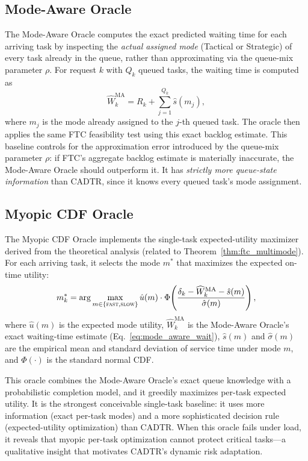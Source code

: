 \documentclass[fleqn,12pt,lineno]{wlpeerj}
\begin{document}
\subsection{Mode-Aware Oracle}
\label{sec:baseline_mode_aware}

The Mode-Aware Oracle computes the exact predicted waiting time for each arriving task by inspecting the \emph{actual assigned mode} (Tactical or Strategic) of every task already in the queue, rather than approximating via the queue-mix parameter $\rho$. For request $k$ with $Q_k$ queued tasks, the waiting time is computed as
\begin{equation}
\widehat{W}_k^{\mathrm{MA}} = R_k + \sum_{j=1}^{Q_k} \hat{s}(m_j),
\label{eq:mode_aware_wait}
\end{equation}
where $m_j$ is the mode already assigned to the $j$-th queued task. The oracle then applies the same FTC feasibility test using this exact backlog estimate. This baseline controls for the approximation error introduced by the queue-mix parameter $\rho$: if FTC's aggregate backlog estimate is materially inaccurate, the Mode-Aware Oracle should outperform it. It has \emph{strictly more queue-state information} than CADTR, since it knows every queued task's mode assignment.

\subsection{Myopic CDF Oracle}
\label{sec:baseline_cdf_oracle}

The Myopic CDF Oracle implements the single-task expected-utility maximizer derived from the theoretical analysis (related to Theorem~\ref{thm:ftc_multimode}). For each arriving task, it selects the mode $m^{\ast}$ that maximizes the expected on-time utility:
\begin{equation}
m_k^{\ast} = \arg\max_{m \in \{\textsc{fast}, \textsc{slow}\}} \hat{u}(m) \cdot \Phi\!\left(\frac{\delta_k - \widehat{W}_k^{\mathrm{MA}} - \hat{s}(m)}{\hat{\sigma}(m)}\right),
\label{eq:cdf_oracle}
\end{equation}
where $\hat{u}(m)$ is the expected mode utility, $\widehat{W}_k^{\mathrm{MA}}$ is the Mode-Aware Oracle's exact waiting-time estimate (Eq.~\ref{eq:mode_aware_wait}), $\hat{s}(m)$ and $\hat{\sigma}(m)$ are the empirical mean and standard deviation of service time under mode $m$, and $\Phi(\cdot)$ is the standard normal CDF.

This oracle combines the Mode-Aware Oracle's exact queue knowledge with a probabilistic completion model, and it greedily maximizes per-task expected utility. It is the strongest conceivable single-task baseline: it uses more information (exact per-task modes) and a more sophisticated decision rule (expected-utility optimization) than CADTR. When this oracle fails under load, it reveals that myopic per-task optimization cannot protect critical tasks---a qualitative insight that motivates CADTR's dynamic risk adaptation.
\end{document}
